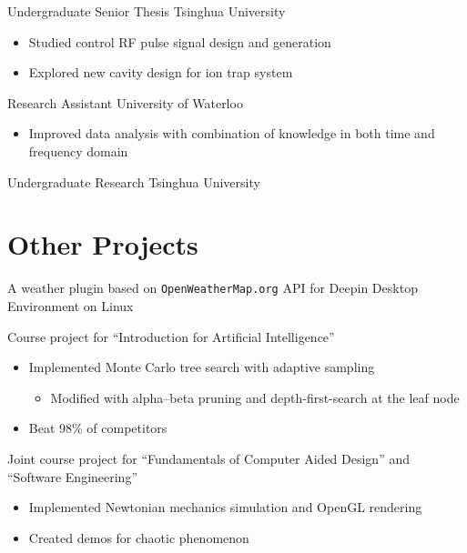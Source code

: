 \documentclass[11pt,letterpaper]{resume}
\begin{document}
Undergraduate Senior Thesis \hfill Tsinghua University
\begin{itemize}
    \item Studied control RF pulse signal design and generation
    \item Explored new cavity design for ion trap system
\end{itemize}\medskip

Research Assistant \hfill University of Waterloo
\begin{itemize}
    \item Improved data analysis with combination of knowledge in both time and frequency domain
\end{itemize}\medskip

Undergraduate Research \hfill Tsinghua University

\section{Other Projects}
A weather plugin based on \texttt{OpenWeatherMap.org} API for Deepin Desktop Environment on Linux\medskip

Course project for ``Introduction for Artificial Intelligence''
\begin{itemize}
    \item Implemented Monte Carlo tree search with adaptive sampling
    \begin{itemize}
        \item Modified with alpha–beta pruning and depth-first-search at 
        the leaf node
    \end{itemize}
    \item Beat 98\% of competitors
\end{itemize}\medskip

Joint course project for ``Fundamentals of Computer Aided Design'' and 
``Software Engineering''
\begin{itemize}
    \item Implemented Newtonian mechanics simulation and OpenGL rendering
    \item Created demos for chaotic phenomenon
\end{itemize}
\end{document}
